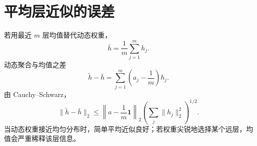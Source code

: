 \documentclass[UTF8,12pt,a4paper,fontset=none]{ctexart}
\numberwithin{equation}{section}
\begin{document}
\section{平均层近似的误差}
若用最近 $m$ 层均值替代动态权重，
\begin{equation}
 \bar h=\frac1m\sum_{j=1}^{m}h_j.
\end{equation}
动态聚合与均值之差
\begin{equation}
 \widetilde h-\bar h=
 \sum_{j=1}^{m}\left(a_j-\frac1m\right)h_j.
\end{equation}
由 Cauchy--Schwarz，
\begin{equation}
 \|\widetilde h-\bar h\|_2
 \le\left\|a-\frac1m\mathbf 1\right\|_2
 \left(\sum_j\|h_j\|_2^2\right)^{1/2}.
\end{equation}
当动态权重接近均匀分布时，简单平均近似良好；若权重尖锐地选择某个远层，均值会严重稀释该层信息。
\end{document}
